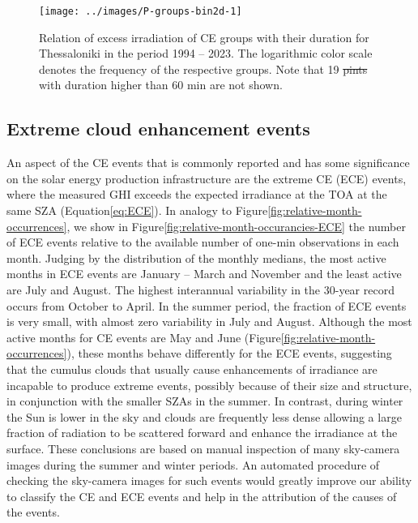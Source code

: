 \documentclass[preprint, 5p,
authoryear]{elsarticle} %
\providecommand{\DIFaddtex}[1]{{\protect\color{blue}\uwave{#1}}} %
\providecommand{\DIFdeltex}[1]{{\protect\color{red}\sout{#1}}}                      %
\providecommand{\DIFaddFL}[1]{\DIFadd{#1}} %
\providecommand{\DIFdelFL}[1]{\DIFdel{#1}} %
\providecommand{\DIFaddbeginFL}{} %
\providecommand{\DIFaddendFL}{} %
\providecommand{\DIFdelbeginFL}{} %
\providecommand{\DIFdelendFL}{} %
\providecommand{\DIFadd}[1]{\texorpdfstring{\DIFaddtex{#1}}{#1}} %
\providecommand{\DIFdel}[1]{\texorpdfstring{\DIFdeltex{#1}}{}} %
\newcommand{\DIFscaledelfig}{0.5}
\newlength{\DIFdelgraphicswidth} %
\newlength{\DIFdelgraphicsheight} %
\newcommand{\DIFaddincludegraphics}[2][]{{\color{blue}\fbox{\DIFOincludegraphics[#1]{#2}}}} %
\newcommand{\DIFdelincludegraphics}[2][]{%
\sbox{\DIFdelgraphicsbox}{\DIFOincludegraphics[#1]{#2}}%
\settoboxwidth{\DIFdelgraphicswidth}{\DIFdelgraphicsbox} %
\settoboxtotalheight{\DIFdelgraphicsheight}{\DIFdelgraphicsbox} %
\scalebox{\DIFscaledelfig}{%
\parbox[b]{\DIFdelgraphicswidth}{\usebox{\DIFdelgraphicsbox}\\[-\baselineskip] \rule{\DIFdelgraphicswidth}{0em}}\llap{\resizebox{\DIFdelgraphicswidth}{\DIFdelgraphicsheight}{%
\setlength{\unitlength}{\DIFdelgraphicswidth}%
\begin{picture}(1,1)%
\thicklines\linethickness{2pt} %
{\color[rgb]{1,0,0}\put(0,0){\framebox(1,1){}}}%
{\color[rgb]{1,0,0}\put(0,0){\line( 1,1){1}}}%
{\color[rgb]{1,0,0}\put(0,1){\line(1,-1){1}}}%
\end{picture}%
}\hspace*{3pt}}} %
} %
\DeclareRobustCommand{\DIFaddbeginFL}{\DIFOaddbeginFL \let\includegraphics\DIFaddincludegraphics} %
\DeclareRobustCommand{\DIFaddendFL}{\DIFOaddendFL \let\includegraphics\DIFOincludegraphics} %
\DeclareRobustCommand{\DIFdelbeginFL}{\DIFOdelbeginFL \let\includegraphics\DIFdelincludegraphics} %
\DeclareRobustCommand{\DIFdelendFL}{\DIFOaddendFL \let\includegraphics\DIFOincludegraphics} %
\begin{document}
\begin{figure}

{\centering \texttt{[image: ../images/P-groups-bin2d-1]} 

}

\caption{Relation of excess irradiation of CE groups with their duration for Thessaloniki in the period 1994 -- 2023. The logarithmic color scale denotes the frequency of the respective groups. Note that 19 \DIFdelbeginFL \DIFdelFL{pints }\DIFdelendFL \DIFaddbeginFL \DIFaddFL{points for groups }\DIFaddendFL with duration higher than 60 min are not shown.}\label{fig:group-2d}
\end{figure}

\hypertarget{extreme-cloud-enhancement-events}{%
\subsection{Extreme cloud enhancement
events}\label{extreme-cloud-enhancement-events}}

An aspect of the CE events that is commonly reported and has some
significance on the solar energy production infrastructure are the
extreme CE (ECE) events, where the measured GHI exceeds the expected
irradiance at the TOA at the same SZA
(Equation\nobreakspace{}\ref{eq:ECE}). In analogy to
Figure\nobreakspace{}\ref{fig:relative-month-occurrences}, we show in
Figure\nobreakspace{}\ref{fig:relative-month-occurancies-ECE} the number
of ECE events relative to the available number of one-min observations
in each month. Judging by the distribution of the monthly medians, the
most active months in ECE events are January -- March and November and
the least active are July and August. The highest interannual
variability in the 30-year record occurs from October to April. In the
summer period, the fraction of ECE events is very small, with almost
zero variability in July and August. Although the most active months for
CE events are May and June
(Figure\nobreakspace{}\ref{fig:relative-month-occurrences}), these
months behave differently for the ECE events, suggesting that the
cumulus clouds that usually cause enhancements of irradiance are
incapable to produce extreme events, possibly because of their size and
structure, in conjunction with the smaller SZAs in the summer. In
contrast, during winter the Sun is lower in the sky and clouds are
frequently less dense allowing a large fraction of radiation to be
scattered forward and enhance the irradiance at the surface. These
conclusions are based on manual inspection of many sky-camera images
during the summer and winter periods. An automated procedure of checking
the sky-camera images for such events would greatly improve our ability
to classify the CE and ECE events and help in the attribution of the
causes of the events.
\end{document}
